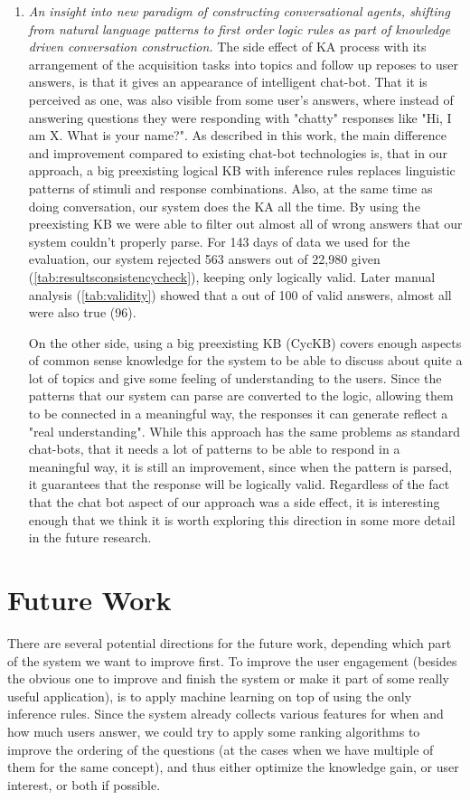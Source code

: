 \begin{enumerate}
	\item \emph{An insight into new paradigm of constructing conversational agents,	shifting from natural language patterns to first order logic rules as part of knowledge driven conversation construction.} 
	The side effect of KA process with its arrangement of the acquisition tasks into topics and follow up reposes to user answers, is that it gives an appearance of  intelligent	chat-bot. That it is perceived as one, was also visible from some user's answers, where instead of answering questions they were responding with "chatty" responses like "Hi, I am X. What is your name?".
	As described in this work, the main difference and improvement compared to existing chat-bot technologies is, that in our approach, a big preexisting logical KB with	inference rules replaces linguistic patterns of stimuli and response combinations. Also, at the same time as doing conversation, 
	our system does the KA all the time. By using the preexisting KB we were able to	filter out almost all of wrong answers that our system couldn't
	properly parse. For 143 days
	of data we used for the evaluation, our system rejected 563 answers out of 22,980 given (\autoref{tab:resultsconsistencycheck}), keeping only logically valid. Later manual analysis (\autoref{tab:validity}) showed that a out of 100 of valid answers, almost all were also true (96).
	
	On the other side, using	a big preexisting KB (CycKB) covers enough aspects of common sense knowledge for the system to be able to discuss about quite a lot of topics and give some feeling of understanding to the users. Since the patterns that our system
	can parse are converted to the logic, allowing them to be connected in a meaningful way, the responses it can generate reflect a "real understanding". While this approach has the same problems as standard chat-bots, that it needs a lot of patterns to be able to respond
	in a meaningful way, it is still an improvement, since when the pattern is
	parsed, it guarantees that the response will be logically valid. Regardless of the fact that the chat bot aspect of our approach was a side effect, it
	is interesting enough that we think it is worth exploring this direction in some more detail in the future research. 
\end{enumerate}

\section{Future Work}
There are several potential directions for the future work, depending which 
part of the system we want to improve first. 
To improve the user engagement (besides the obvious one to improve and finish
the system or make it part of some really useful application), is to apply
machine learning on top of using the only inference rules. Since the system
already collects various features for when and how much users answer, we could
try to apply some ranking algorithms to improve the ordering of the questions 
(at the cases when we have multiple of them for the same concept), and thus
either optimize the knowledge gain, or user interest, or both if possible.

